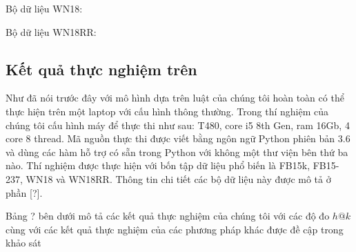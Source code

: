 Bộ dữ liệu WN18:

Bộ dữ liệu WN18RR:

\subsection{Kết quả thực nghiệm trên}
Như đã nói trước đây với mô hình dựa trên luật của chúng tôi hoàn toàn có thể thực hiện trên một laptop với cấu hình thông thường. Trong thí nghiệm của chúng tôi cấu hình máy để thực thi như sau: T480, core i5 8th Gen, ram 16Gb, 4 core 8 thread. Mã nguồn thực thi được viết bằng ngôn ngữ Python phiên bản 3.6 và dùng các hàm hỗ trợ có sẵn trong Python với không một thư viện bên thứ ba nào. Thí nghiệm được thực hiện với bốn tập dữ liệu phổ biến là FB15k, FB15-237, WN18 và WN18RR. Thông tin chi tiết các bộ dữ liệu này được mô tả ở phần [?].

Bảng ? bên dưới mô tả các kết quả thực nghiệm của chúng tôi với các độ đo \(h@k\) cùng với các kết quả thực nghiệm của các phương pháp khác được đề cập trong khảo  sát \cite{rossi2020knowledge}

